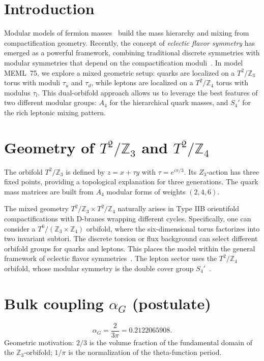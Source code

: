 \documentclass[12pt,a4paper]{article}
\numberwithin{equation}{section}
\begin{document}
\newpage

\section{Introduction}
Modular models of fermion masses~\cite{Feruglio2017,Kobayashi2019,Novichkov2019,Ding2021}
build the mass hierarchy and mixing from compactification geometry.
Recently, the concept of \emph{eclectic flavor symmetry} has emerged as a powerful framework, combining traditional discrete symmetries with modular symmetries that depend on the compactification moduli~\cite{Nilles2020,Baur2024}. In model MEML~75, we explore a mixed geometric setup: quarks are localized on a \(T^2/\mathbb{Z}_3\) torus with moduli \(\tau_u\) and \(\tau_d\), while leptons are localized on a \(T^2/\mathbb{Z}_4\) torus with modulus \(\tau_l\). This dual-orbifold approach allows us to leverage the best features of two different modular groups: \(A_4\) for the hierarchical quark masses, and \(S_4'\) for the rich leptonic mixing pattern.

\section{Geometry of \(T^2/\mathbb{Z}_3\) and \(T^2/\mathbb{Z}_4\)}
The orbifold \(T^2/\mathbb{Z}_3\) is defined by \(z = x + \tau y\) with \(\tau = e^{i\pi/3}\). Its $Z_3$-action has three fixed points, providing a topological explanation for three generations. The quark mass matrices are built from \(A_4\) modular forms of weights \((2,4,6)\).

The mixed geometry \(T^2/\mathbb{Z}_3 \times T^2/\mathbb{Z}_4\) naturally arises in Type IIB orientifold compactifications with D-branes wrapping different cycles. Specifically, one can consider a \(T^6/(\mathbb{Z}_3 \times \mathbb{Z}_4)\) orbifold, where the six-dimensional torus factorizes into two invariant subtori. The discrete torsion or flux background can select different orbifold groups for quarks and leptons. This places the model within the general framework of eclectic flavor symmetries~\cite{Baur2024}. The lepton sector uses the \(T^2/\mathbb{Z}_4\) orbifold, whose modular symmetry is the double cover group \(S_4'\)~\cite{Novichkov2019,Ding2021}.

\section{Bulk coupling \(\alpha_G\) (postulate)}
\begin{equation}
\alpha_G = \frac{2}{3\pi} = 0.2122065908.
\end{equation}
Geometric motivation: \(2/3\) is the volume fraction of the fundamental domain of the \(\mathbb{Z}_3\)-orbifold; \(1/\pi\) is the normalization of the theta-function period.
\end{document}
